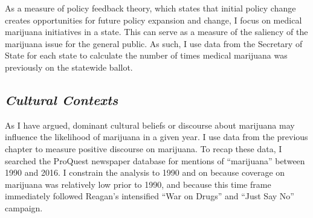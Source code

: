 As a measure of policy feedback theory, which states that initial policy change creates opportunities for future policy expansion and change, I focus on medical marijuana initiatives in a state. This can serve as a measure of the saliency of the marijuana issue for the general public. As such, I use data from the Secretary of State for each state to calculate the number of times medical marijuana was previously on the statewide ballot.


\subsection{\it{Cultural Contexts}}

As I have argued, dominant cultural beliefs or discourse about marijuana may influence the likelihood of marijuana in a given year. I use data from the previous chapter to measure positive discourse on marijuana. To recap these data, I searched the ProQuest newspaper database for mentions of ``marijuana'' between 1990 and 2016. I constrain the analysis to 1990 and on because coverage on marijuana was relatively low prior to 1990, and because this time frame immediately followed Reagan's intensified ``War on Drugs'' and ``Just Say No'' campaign. 

